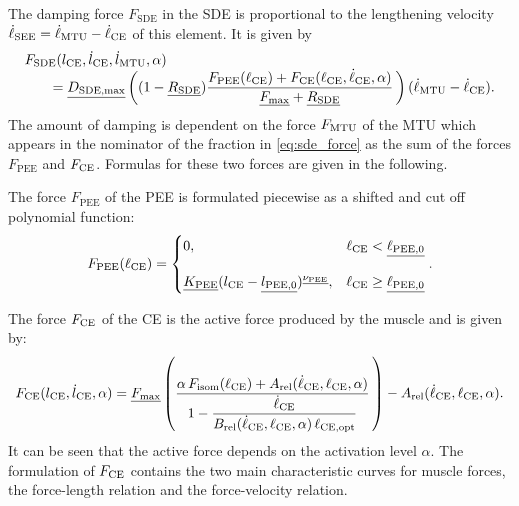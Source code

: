 The damping force $F_\text{SDE}$ in the SDE is proportional to the lengthening velocity ${\dot{\ell}_\text{SEE} = \dot{\ell}_{\text{MTU}} - \dot{\ell}_{\text{CE}}}$ of this element. It is given by
\begin{equation}\label{eq:sde_force}
  \begin{array}{lll}
    F_\text{SDE}(l_{\text{CE}},\dot{l}_{\text{CE}},\dot{l}_{\text{MTU}},\alpha) \\ \qquad = \underline{D_\text{SDE,max}}\left( (1-\underline{R_\text{SDE}}) \displaystyle\frac{\displaystyle{F_\text{PEE}(\ell_{\text{CE}})+F_\text{CE}(\ell_{\text{CE}}, \dot{\ell}_{\text{CE}}, \alpha)}}{\displaystyle{\underline{F_\text{max}} + \underline{R_\text{SDE}}}}\, \right) (\dot{\ell}_{\text{MTU}} - \dot{\ell}_{\text{CE}}).
  \end{array}
\end{equation}
The amount of damping is dependent on the force $F_{\text{MTU}}$ of the MTU which appears in the nominator of the fraction in \cref{eq:sde_force} as the sum of the forces $F_\text{PEE}$ and $F_{\text{CE}}$. Formulas for these two forces are given in the following.

The force $F_\text{PEE}$ of the PEE is formulated piecewise as a shifted and cut off polynomial function:
\begin{equation}\label{eq:fpee}
  \begin{array}{lll}
    F_\text{PEE}(\ell_{\text{CE}}) = \begin{cases}
      0, & \ell_{\text{CE}} < \underline{\ell_{\text{PEE},0}}\\[4mm]
    \underline{K_\text{PEE}}(l_{\text{CE}} - \underline{l_{\text{PEE},0}})^{\underline{\nu_\text{PEE}}},& \ell_{\text{CE}} \geq \underline{\ell_{\text{PEE},0}}
    \end{cases}.
  \end{array}
\end{equation}

The force $F_{\text{CE}}$ of the CE is the active force produced by the muscle and is given by:
\begin{equation}\label{eq:fce}
  \begin{array}{lll}
    F_{\text{CE}}(l_{\text{CE}}, \dot{l}_{\text{CE}}, \alpha) 
    = \underline{F_\text{max}} \left(
    \displaystyle\frac{\displaystyle{\alpha\,F_\text{isom}(\ell_{\text{CE}}) + A_\text{rel}(\dot{\ell}_{\text{CE}},\ell_{\text{CE}},\alpha)}}{\displaystyle{1 - 
    \frac{\dot{\ell}_{\text{CE}}}
    {B_\text{rel}(\dot{\ell}_{\text{CE}},\ell_{\text{CE}},\alpha)\,\ell_{\text{CE},\text{opt}}}}}\,\right)
    - A_\text{rel}(\dot{\ell}_{\text{CE}},\ell_{\text{CE}},\alpha).
  \end{array}
\end{equation}
It can be seen that the active force depends on the activation level $\alpha$. 
The formulation of $F_{\text{CE}}$ contains the two main characteristic curves for muscle forces, the force-length relation and the force-velocity relation.

